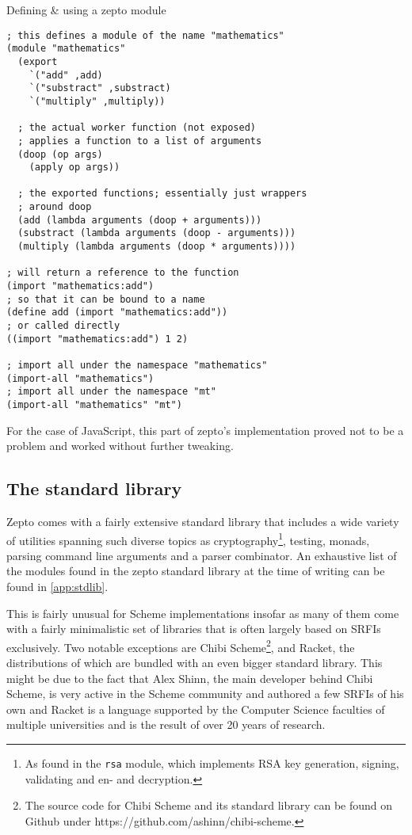 \documentclass[oneside,11pt,xetex]{scrbook}
\begin{document}
\begin{listing}[H]
\caption{Defining \& using a zepto module}
\begin{verbatim}
; this defines a module of the name "mathematics"
(module "mathematics"
  (export
    `("add" ,add)
    `("substract" ,substract)
    `("multiply" ,multiply))

  ; the actual worker function (not exposed)
  ; applies a function to a list of arguments
  (doop (op args)
    (apply op args))

  ; the exported functions; essentially just wrappers
  ; around doop
  (add (lambda arguments (doop + arguments)))
  (substract (lambda arguments (doop - arguments)))
  (multiply (lambda arguments (doop * arguments))))

; will return a reference to the function
(import "mathematics:add")
; so that it can be bound to a name
(define add (import "mathematics:add"))
; or called directly
((import "mathematics:add") 1 2)

; import all under the namespace "mathematics"
(import-all "mathematics")
; import all under the namespace "mt"
(import-all "mathematics" "mt")
\end{verbatim}
\end{listing}
\label{fig:zepmod}

For the case of JavaScript, this part of zepto's implementation proved not
to be a problem and worked without further tweaking.

\subsection{The standard library}

Zepto comes with a fairly extensive standard library that includes a wide
variety of utilities spanning such diverse topics as cryptography\footnote{As found
in the \texttt{rsa} module, which implements RSA key generation, signing,
validating and en- and decryption.}, testing, monads, parsing command line
arguments and a parser combinator. An exhaustive list of the modules found
in the zepto standard library at the time of writing can be found in \ref{app:stdlib}.

This is fairly unusual for Scheme implementations insofar as many of them
come with a fairly minimalistic set of libraries that is often largely based
on SRFIs exclusively. Two notable exceptions are Chibi Scheme\footnote{The source
code for Chibi Scheme and its standard library can be found on Github under
https://github.com/ashinn/chibi-scheme.}, and Racket, the distributions of which
are bundled with an even bigger standard library. This might be due to the fact
that Alex Shinn, the main developer behind Chibi Scheme, is very active in the
Scheme community and authored a few SRFIs of his own and Racket is a language
supported by the Computer Science faculties of multiple universities  and is
the result of over 20 years of research.
\end{document}
